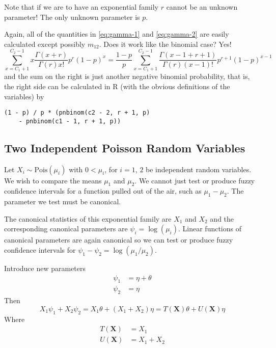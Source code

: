 \documentclass{article}
\newcommand{\PoissonDis}{\text{Pois}}
\begin{document}
Note that if we are to have an exponential family $r$ cannot be an unknown
parameter!  The only unknown parameter is $p$.

Again, all of the quantities in \eqref{eq:gamma-1} and \eqref{eq:gamma-2}
are easily calculated except possibly $m_{1 2}$.  Does it work like the
binomial case?  Yes!
$$
   \sum_{x = C_1 + 1}^{C_2 - 1} x \frac{\Gamma(x+r)}{\Gamma(r) x!} p^r (1-p)^x
   =
   \frac{1 - p}{p} \sum_{x = C_1 + 1}^{C_2 - 1}
   \frac{\Gamma(x - 1 + r + 1)}{\Gamma(r) (x - 1)!} p^{r + 1} (1-p)^{x - 1}
$$
and the sum on the right is just another negative binomial probability,
that is, the right side can be calculated
in R (with the obvious definitions of the variables) by
\begin{verbatim}
(1 - p) / p * (pnbinom(c2 - 2, r + 1, p)
    - pnbinom(c1 - 1, r + 1, p))
\end{verbatim}

\subsection{Two Independent Poisson Random Variables}

Let $X_i \sim \PoissonDis(\mu_i)$ with $0 < \mu_i$, for $i = 1$, $2$
be independent random variables.  We wish to compare the means $\mu_1$ and
$\mu_2$.  We cannot just test or produce fuzzy confidence intervals for
a function pulled out of the air, such as $\mu_1 - \mu_2$.  The parameter
we test must be canonical.

The canonical statistics of this exponential family are $X_1$ and $X_2$
and the corresponding canonical parameters are $\psi_i = \log(\mu_i)$.
Linear functions of canonical parameters are again canonical so we can test
or produce fuzzy confidence intervals
for $\psi_1 - \psi_2 = \log(\mu_1 / \mu_2)$.

Introduce new parameters
\begin{align*}
   \psi_1 & = \eta + \theta
   \\
   \psi_2 & = \eta
\end{align*}
Then
$$
   X_1 \psi_1 + X_2 \psi_2
   =
   X_1 \theta + (X_1 + X_2) \eta
   =
   T(\mathbf{X}) \theta + U(\mathbf{X}) \eta
$$
Where
\begin{equation} \label{eq:t-and-u}
\begin{split}
   T(\mathbf{X}) & = X_1
   \\
   U(\mathbf{X}) & = X_1 + X_2
\end{split}
\end{equation}
\end{document}
